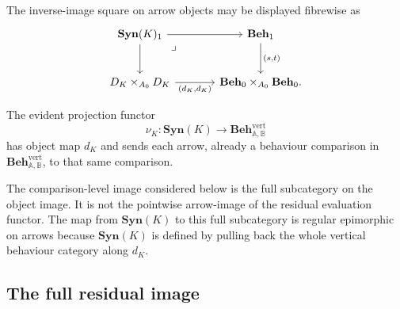 The inverse-image square on arrow objects may be displayed fibrewise as
\[
    \begin{tikzcd}[column sep=large, row sep=large]
            \mathbf{Syn}(K)_1
                \arrow[r]
                \arrow[d]
                \arrow[dr, phantom, "\lrcorner", very near start]
        &
            \mathbf{Beh}_1
                \arrow[d, "{(s,t)}"]
        \\
            D_K\times_{A_0}D_K
                \arrow[r, "{(d_K,d_K)}"']
        &
            \mathbf{Beh}_0\times_{A_0}\mathbf{Beh}_0.
    \end{tikzcd}
\]

The evident projection functor
\[
    \nu_K:
    \mathbf{Syn}(K)\to
    \mathbf{Beh}^{\mathrm{vert}}_{\mathbb A,\mathbb B}
\]
has object map \(d_K\) and sends each arrow, already a behaviour comparison in \(\mathbf{Beh}^{\mathrm{vert}}_{\mathbb A,\mathbb B}\), to that same comparison.

\begin{remark}
\label{rem:comparison-level-image-full}
    The comparison-level image considered below is the full subcategory on the object image. It is not the pointwise arrow-image of the residual evaluation functor. The map from \(\mathbf{Syn}(K)\) to this full subcategory is regular epimorphic on arrows because \(\mathbf{Syn}(K)\) is defined by pulling back the whole vertical behaviour category along \(d_K\).
\end{remark}

\subsection{The full residual image}
\label{subsec:full-residual-image}

